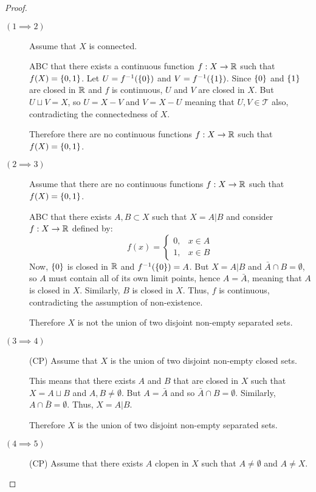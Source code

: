\documentclass[letterpaper,12pt,fleqn]{article}
\newcommand{\T}{\mathscr{T}}
\begin{document}
\begin{proof}
  \begin{description}
  \item[]
  \item[\((1\implies2)\)] Assume that \(X\) is connected.

    ABC that there exists a continuous function \(f:X\to\mathbb{R}\) such that \(f(X)=\{0,1\}\).  Let
    \(U=f^{-1}(\{0\})\) and \(V=f^{-1}(\{1\})\).  Since \(\{0\}\) and \(\{1\}\) are closed in \(\mathbb{R}\) and
    \(f\) is continuous, \(U\) and \(V\) are closed in \(X\).  But \(U\sqcup V=X\), so \(U=X-V\) and \(V=X-U\)
    meaning that \(U,V\in\T\) also, contradicting the connectedness of \(X\).

    Therefore there are no continuous functions \(f:X\to\mathbb{R}\) such that \(f(X)=\{0,1\}\).

  \item[\((2\implies3)\)] Assume that there are no continuous functions \(f:X\to\mathbb{R}\) such that \(f(X)=\{0,1\}\).

    ABC that there exists \(A,B\subset X\) such that \(X=A|B\) and consider \(f:X\to\mathbb{R}\) defined by:
    \[f(x)=\begin{cases}
    0, & x\in A \\
    1, & x\in B
    \end{cases}\]
    Now, \(\{0\}\) is closed in \(\mathbb{R}\) and \(f^{-1}(\{0\})=A\).  But \(X=A|B\) and \(\bar{A}\cap B=\emptyset\),
    so \(A\) must contain all of its own limit points, hence \(A=\bar{A}\), meaning that \(A\) is closed in \(X\).
    Similarly, \(B\) is closed in \(X\).  Thus, \(f\) is continuous, contradicting the assumption of non-existence.

    Therefore \(X\) is not the union of two disjoint non-empty separated sets.

  \item[\((3\implies4)\)] (CP) Assume that \(X\) is the union of two disjoint non-empty closed sets.

    This means that there exists \(A\) and \(B\) that are closed in \(X\) such that \(X=A\sqcup B\) and
    \(A,B\ne\emptyset\).  But \(A=\bar{A}\) and so \(\bar{A}\cap B=\emptyset\).  Similarly,
    \(A\cap\bar{B}=\emptyset\).  Thus, \(X=A|B\).

    Therefore \(X\) is the union of two disjoint non-empty separated sets.

  \item[\((4\implies5)\)] (CP) Assume that there exists \(A\) clopen in \(X\) such that \(A\ne\emptyset\) and
    \(A\ne X\).


\end{description}
\end{proof}
\end{document}
